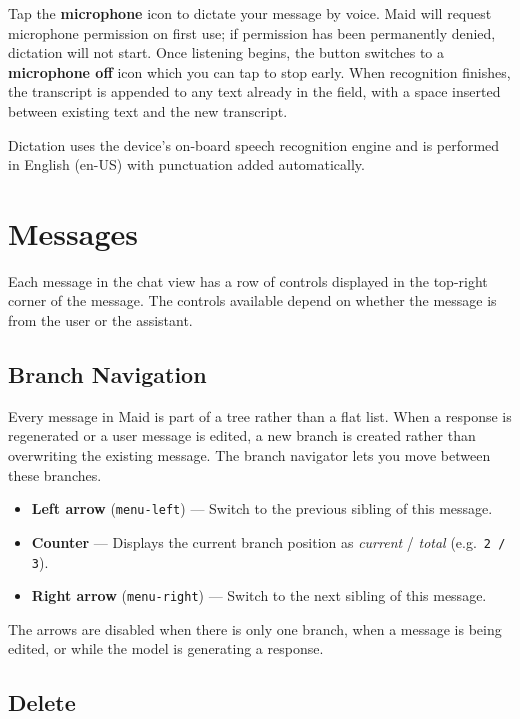 \documentclass[12pt,a4paper]{article}
\begin{document}
Tap the \textbf{microphone} icon to dictate your message by voice. Maid will request microphone permission on first use; if permission has been permanently denied, dictation will not start. Once listening begins, the button switches to a \textbf{microphone off} icon which you can tap to stop early. When recognition finishes, the transcript is appended to any text already in the field, with a space inserted between existing text and the new transcript.

Dictation uses the device's on-board speech recognition engine and is performed in English (en-US) with punctuation added automatically.

\section{Messages}

Each message in the chat view has a row of controls displayed in the top-right corner of the message. The controls available depend on whether the message is from the user or the assistant.

\subsection{Branch Navigation}

Every message in Maid is part of a tree rather than a flat list. When a response is regenerated or a user message is edited, a new branch is created rather than overwriting the existing message. The branch navigator lets you move between these branches.

\begin{itemize}[noitemsep]
    \item \textbf{Left arrow} (\texttt{menu-left}) — Switch to the previous sibling of this message.
    \item \textbf{Counter} — Displays the current branch position as \emph{current} / \emph{total} (e.g.\ \texttt{2 / 3}).
    \item \textbf{Right arrow} (\texttt{menu-right}) — Switch to the next sibling of this message.
\end{itemize}

The arrows are disabled when there is only one branch, when a message is being edited, or while the model is generating a response.

\subsection{Delete}
\end{document}
